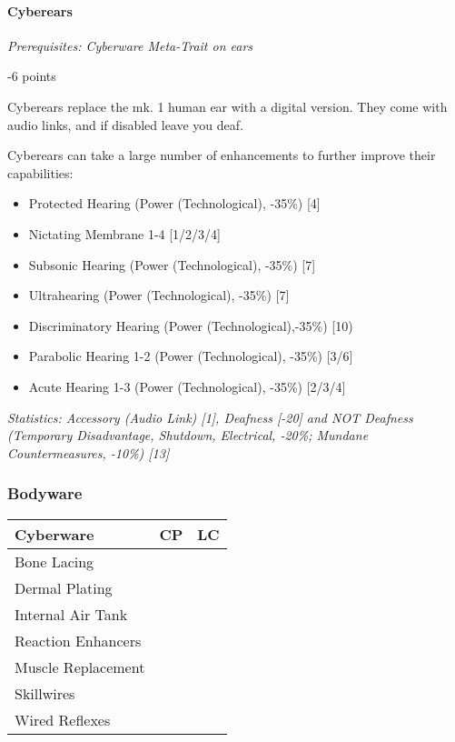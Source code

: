 \begin{multicols*}{3}
	\paragraph{Cyberears}
	\textit{Prerequisites: Cyberware Meta-Trait on ears}
	\begin{flushright}
		-6 points
	\end{flushright}
	
	Cyberears replace the mk. 1 human ear with a digital version. They come with audio links, and if disabled leave you deaf.
	
	Cyberears can take a large number of enhancements to further improve their capabilities: 
	
	\begin{itemize}
		\item Protected Hearing (Power (Technological), -35\%) [4]
		\item Nictating Membrane 1-4 [1/2/3/4]
		\item Subsonic Hearing (Power (Technological), -35\%) [7]
		\item Ultrahearing (Power (Technological), -35\%) [7]
		\item Discriminatory Hearing (Power (Technological),-35\%) [10)
		\item Parabolic Hearing 1-2 (Power (Technological), -35\%) [3/6]
		\item Acute Hearing 1-3 (Power (Technological), -35\%) [2/3/4]
	\end{itemize}
	
	\textit{\textcolor{OliveGreen}{Statistics: Accessory (Audio Link) [1], Deafness [-20] and NOT Deafness (Temporary Disadvantage, Shutdown, Electrical, -20\%; Mundane Countermeasures, -10\%) [13]}}
	
	\subsubsection{Bodyware}
	
	\begin{center}
		\begin{tabularx}{0.32\textwidth}{|X|c|c|}
			\hline
			Cyberware & CP & LC\\
			\hline
			\hline
			Bone Lacing & & \\
			Dermal Plating & & \\
			Internal Air Tank & & \\
			Reaction Enhancers & & \\
			Muscle Replacement & & \\
			Skillwires & & \\
			Wired Reflexes & & \\
			\hline
		\end{tabularx}
	\end{center}
	

\end{multicols*}

